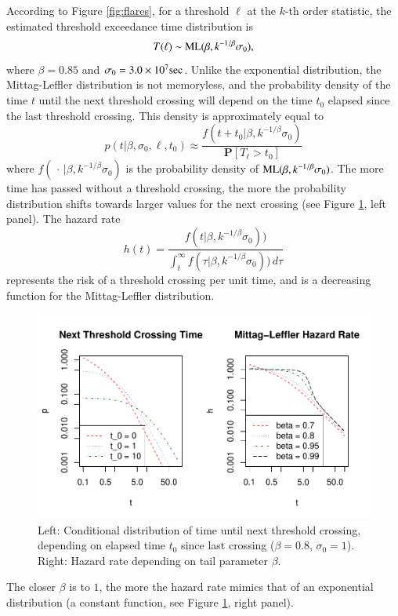 \documentclass[]{elsarticle} %
\begin{document}
According to Figure \ref{fig:flares}, for a threshold \(\ell\) at the
\(k\)-th order statistic, the estimated threshold exceedance time
distribution is \[
T(\ell) \sim {\rm ML}(\beta, k^{-1/\beta} \sigma_0), 
\] where \(\beta = 0.85\) and \(\sigma_0 = 3.0 \times 10^7 {\rm sec}\).
Unlike the exponential distribution, the Mittag-Leffler distribution is
not memoryless, and the probability density of the time \(t\) until the
next threshold crossing will depend on the time \(t_0\) elapsed since
the last threshold crossing. This density is approximately equal to \[
p(t|\beta, \sigma_0, \ell, t_0) \approx \frac{f(t + t_0 | \beta, k^{-1/\beta} \sigma_0)}{\mathbf P[T_\ell > t_0]}
\] where \(f(\,\cdot\, | \beta, k^{-1/\beta} \sigma_0)\) is the
probability density of \({\rm ML}(\beta, k^{-1/\beta} \sigma_0)\). The
more time has passed without a threshold crossing, the more the
probability distribution shifts towards larger values for the next
crossing (see Figure \ref{fig:hazard}, left panel). The hazard rate \[
h(t) = \frac{f(t| \beta, k^{-1/\beta} \sigma_0))}{\int_t^\infty f(\tau| \beta, k^{-1/\beta} \sigma_0))\,d\tau}
\] represents the risk of a threshold crossing per unit time, and is a
decreasing function for the Mittag-Leffler distribution.

\begin{figure}
\includegraphics[width=\textwidth]{article_springer_files/figure-latex/hazard-1} \caption{\label{fig:hazard} Left: Conditional distribution of time until next threshold crossing, depending on elapsed time $t_0$ since last crossing ($\beta = 0.8$, $\sigma_0 = 1$). Right: Hazard rate depending on tail parameter $\beta$.}\label{fig:hazard}
\end{figure}

The closer \(\beta\) is to \(1\), the more the hazard rate mimics that
of an exponential distribution (a constant function, see Figure
\ref{fig:hazard}, right panel).
\end{document}
